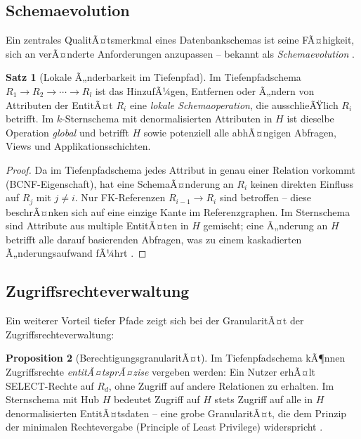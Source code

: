 ﻿\documentclass[12pt,a4paper]{article}
\theoremstyle{definition}
\newtheorem{theorem}{Satz}[section]
\newtheorem{proposition}[theorem]{Proposition}
\theoremstyle{remark}
\begin{document}
\subsection{Schemaevolution}

Ein zentrales QualitÃ¤tsmerkmal eines Datenbankschemas ist seine
FÃ¤higkeit, sich an verÃ¤nderte Anforderungen anzupassen -- bekannt als
\emph{Schemaevolution} \cite{Roddick1995}.

\begin{theorem}[Lokale Ã„nderbarkeit im Tiefenpfad]
\label{thm:schaemaevolution}
Im Tiefenpfadschema $R_1 \to R_2 \to \cdots \to R_l$ ist das HinzufÃ¼gen,
Entfernen oder Ã„ndern von Attributen der EntitÃ¤t $R_i$ eine
\emph{lokale Schemaoperation}, die ausschlieÃŸlich $R_i$ betrifft.
Im $k$-Sternschema mit denormalisierten Attributen in $H$ ist dieselbe
Operation \emph{global} und betrifft $H$ sowie potenziell alle
abhÃ¤ngigen Abfragen, Views und Applikationsschichten.
\end{theorem}

\begin{proof}
Da im Tiefenpfadschema jedes Attribut in genau einer Relation vorkommt
(BCNF-Eigenschaft), hat eine SchemaÃ¤nderung an $R_i$ keinen direkten
Einfluss auf $R_j$ mit $j \neq i$. Nur FK-Referenzen
$R_{i-1} \to R_i$ sind betroffen -- diese beschrÃ¤nken sich auf eine
einzige Kante im Referenzgraphen. Im Sternschema sind Attribute aus
multiple EntitÃ¤ten in $H$ gemischt; eine Ã„nderung an $H$ betrifft
alle darauf basierenden Abfragen, was zu einem kaskadierten
Ã„nderungsaufwand fÃ¼hrt \cite{Ambler2003}.
\end{proof}

\subsection{Zugriffsrechteverwaltung}

Ein weiterer Vorteil tiefer Pfade zeigt sich bei der GranularitÃ¤t der
Zugriffsrechteverwaltung:

\begin{proposition}[BerechtigungsgranularitÃ¤t]
Im Tiefenpfadschema kÃ¶nnen Zugriffsrechte \emph{entitÃ¤tsprÃ¤zise} vergeben
werden: Ein Nutzer erhÃ¤lt SELECT-Rechte auf $R_d$, ohne Zugriff auf andere
Relationen zu erhalten. Im Sternschema mit Hub $H$ bedeutet Zugriff auf
$H$ stets Zugriff auf alle in $H$ denormalisierten EntitÃ¤tsdaten --
eine grobe GranularitÃ¤t, die dem Prinzip der minimalen Rechtevergabe
(Principle of Least Privilege) widerspricht \cite{Saltzer1975}.
\end{proposition}
\end{document}
